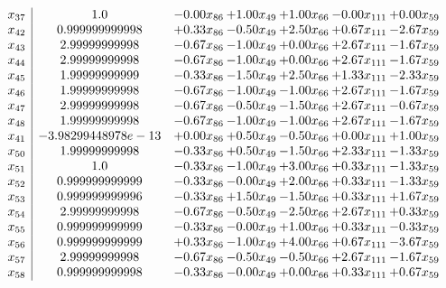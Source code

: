 \documentclass[8pt]{article}
\begin{document}
\[\begin{array}{c| c c@{\hskip 2pt} c@{\hskip 2pt} c@{\hskip 2pt} c@{\hskip 2pt} c@{\hskip 2pt} }
 x_{37}   &  1.0 & -0.00 x_{86} & +  1.00 x_{49} & +  1.00 x_{66} & -0.00 x_{111} & +  0.00 x_{59}\\
 x_{42}   &  0.999999999998 & +  0.33 x_{86} & -0.50 x_{49} & +  2.50 x_{66} & +  0.67 x_{111} & -2.67 x_{59}\\
 x_{43}   &  2.99999999998 & -0.67 x_{86} & -1.00 x_{49} & +  0.00 x_{66} & +  2.67 x_{111} & -1.67 x_{59}\\
 x_{44}   &  2.99999999998 & -0.67 x_{86} & -1.00 x_{49} & +  0.00 x_{66} & +  2.67 x_{111} & -1.67 x_{59}\\
 x_{45}   &  1.99999999999 & -0.33 x_{86} & -1.50 x_{49} & +  2.50 x_{66} & +  1.33 x_{111} & -2.33 x_{59}\\
 x_{46}   &  1.99999999998 & -0.67 x_{86} & -1.00 x_{49} & -1.00 x_{66} & +  2.67 x_{111} & -1.67 x_{59}\\
 x_{47}   &  2.99999999998 & -0.67 x_{86} & -0.50 x_{49} & -1.50 x_{66} & +  2.67 x_{111} & -0.67 x_{59}\\
 x_{48}   &  1.99999999998 & -0.67 x_{86} & -1.00 x_{49} & -1.00 x_{66} & +  2.67 x_{111} & -1.67 x_{59}\\
 x_{41}   &  -3.98299448978e-13 & +  0.00 x_{86} & +  0.50 x_{49} & -0.50 x_{66} & +  0.00 x_{111} & +  1.00 x_{59}\\
 x_{50}   &  1.99999999998 & -0.33 x_{86} & +  0.50 x_{49} & -1.50 x_{66} & +  2.33 x_{111} & -1.33 x_{59}\\
 x_{51}   &  1.0 & -0.33 x_{86} & -1.00 x_{49} & +  3.00 x_{66} & +  0.33 x_{111} & -1.33 x_{59}\\
 x_{52}   &  0.999999999999 & -0.33 x_{86} & -0.00 x_{49} & +  2.00 x_{66} & +  0.33 x_{111} & -1.33 x_{59}\\
 x_{53}   &  0.999999999996 & -0.33 x_{86} & +  1.50 x_{49} & -1.50 x_{66} & +  0.33 x_{111} & +  1.67 x_{59}\\
 x_{54}   &  2.99999999998 & -0.67 x_{86} & -0.50 x_{49} & -2.50 x_{66} & +  2.67 x_{111} & +  0.33 x_{59}\\
 x_{55}   &  0.999999999999 & -0.33 x_{86} & -0.00 x_{49} & +  1.00 x_{66} & +  0.33 x_{111} & -0.33 x_{59}\\
 x_{56}   &  0.999999999999 & +  0.33 x_{86} & -1.00 x_{49} & +  4.00 x_{66} & +  0.67 x_{111} & -3.67 x_{59}\\
 x_{57}   &  2.99999999998 & -0.67 x_{86} & -0.50 x_{49} & -0.50 x_{66} & +  2.67 x_{111} & -1.67 x_{59}\\
 x_{58}   &  0.999999999998 & -0.33 x_{86} & -0.00 x_{49} & +  0.00 x_{66} & +  0.33 x_{111} & +  0.67 x_{59}\\

\end{array}\]
\end{document}
